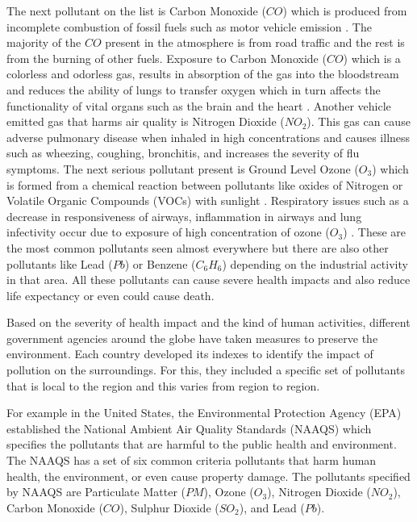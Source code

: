 The next pollutant on the list is Carbon Monoxide ($CO$) which is produced from incomplete combustion of fossil fuels such as motor vehicle emission \cite{Payus2019}. The majority of the $CO$ present in the atmosphere is from road traffic and the rest is from the burning of other fuels\cite{Payus2019}. Exposure to Carbon Monoxide ($CO$) which is a colorless and odorless gas, results in absorption of the gas into the bloodstream and reduces the ability of lungs to transfer oxygen which in turn affects the functionality of vital organs such as the brain and the heart \cite{Sierra-vargas2012} \cite{Golbabaei2012}. Another vehicle emitted gas that harms air quality is Nitrogen Dioxide ($NO_2$). This gas can cause adverse pulmonary disease when inhaled in high concentrations and causes illness such as wheezing, coughing, bronchitis, and increases the severity of flu symptoms\cite{Salonen2019}. The next serious pollutant present is Ground Level Ozone ($O_3$) which is formed from a chemical reaction between pollutants like oxides of Nitrogen or Volatile Organic Compounds (VOCs) with sunlight \cite{EPA2018}. Respiratory issues such as a decrease in responsiveness of airways, inflammation in airways and lung infectivity occur due to exposure of high concentration of ozone ($O_3$) \cite{Lippmann1989}. These are the most common pollutants seen almost everywhere but there are also other pollutants like Lead ($Pb$) or Benzene ($C_{6}H_{6}$) depending on the industrial activity in that area. All these pollutants can cause severe health impacts and also reduce life expectancy or even could cause death.

Based on the severity of health impact and the kind of human activities, different government agencies around the globe have taken measures to preserve the environment. Each country developed its indexes to identify the impact of pollution on the surroundings. For this, they included a specific set of pollutants that is local to the region and this varies from region to region.

For example in the United States, the Environmental Protection Agency (EPA) established the National Ambient Air Quality Standards (NAAQS) which specifies the pollutants that are harmful to the public health and environment. The NAAQS has a set of six common criteria pollutants that harm human health, the environment, or even cause property damage. The pollutants specified by NAAQS are Particulate Matter ($PM$), Ozone ($O_3$),  Nitrogen Dioxide ($NO_2$), Carbon Monoxide ($CO$), Sulphur Dioxide ($SO_2$), and Lead ($Pb$).

